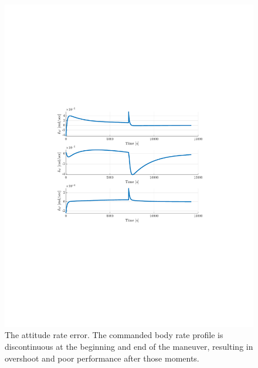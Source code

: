 \documentclass[]{article}
\begin{document}
\begin{figure}[!h]
	\centering
	\includegraphics[width=\linewidth,trim={4cm, 8cm, 4cm, 8cm},clip]{figs/P3Q2.pdf}
	\caption{The attitude rate error. The commanded body rate profile is discontinuous at the beginning and end of the maneuver, resulting in overshoot and poor performance after those moments.}
	\label{fig:P3Q2}
\end{figure}
\end{document}
